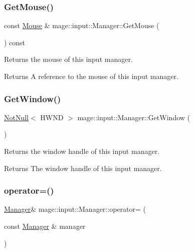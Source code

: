 \subsubsection{\texorpdfstring{Get\+Mouse()}{GetMouse()}}
{\footnotesize\ttfamily const \mbox{\hyperlink{classmage_1_1input_1_1_mouse}{Mouse}} \& mage\+::input\+::\+Manager\+::\+Get\+Mouse (\begin{DoxyParamCaption}{ }\end{DoxyParamCaption}) const\hspace{0.3cm}{\ttfamily [noexcept]}}

Returns the mouse of this input manager.

\begin{DoxyReturn}{Returns}
A reference to the mouse of this input manager. 
\end{DoxyReturn}
\mbox{\label{classmage_1_1input_1_1_manager_aca0295dd551eba67329740599a80f24d}} 
\subsubsection{\texorpdfstring{Get\+Window()}{GetWindow()}}
{\footnotesize\ttfamily \mbox{\hyperlink{namespacemage_a8769f9d670d6b585ea306cb1062af94b}{Not\+Null}}$<$ H\+W\+ND $>$ mage\+::input\+::\+Manager\+::\+Get\+Window (\begin{DoxyParamCaption}{ }\end{DoxyParamCaption})\hspace{0.3cm}{\ttfamily [noexcept]}}

Returns the window handle of this input manager.

\begin{DoxyReturn}{Returns}
The window handle of this input manager. 
\end{DoxyReturn}
\mbox{\label{classmage_1_1input_1_1_manager_a5fb8b5797f2048cf31fb4c2a05ba5d02}} 
\subsubsection{\texorpdfstring{operator=()}{operator=()}\hspace{0.1cm}{\footnotesize\ttfamily [1/2]}}
{\footnotesize\ttfamily \mbox{\hyperlink{classmage_1_1input_1_1_manager}{Manager}}\& mage\+::input\+::\+Manager\+::operator= (\begin{DoxyParamCaption}\item[{const \mbox{\hyperlink{classmage_1_1input_1_1_manager}{Manager}} \&}]{manager }\end{DoxyParamCaption})\hspace{0.3cm}{\ttfamily [delete]}}

